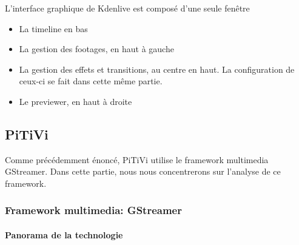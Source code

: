 {\begin{figure}[H]
\end{figure}

L'interface graphique de Kdenlive est composé d'une seule fenêtre 

\begin{itemize}

  \item {La timeline en bas}

  \item {La gestion des footages, en haut à gauche}

  \item {La gestion des effets et transitions, au centre en haut. La
  configuration de ceux-ci se fait dans cette même partie.}

  \item {Le previewer, en haut à droite}

\end{itemize}

\subsection {PiTiVi}

Comme précédemment énoncé, PiTiVi utilise le framework multimedia
GStreamer. Dans cette partie, nous nous concentrerons sur l'analyse
de ce framework.

\subsubsection {Framework multimedia: GStreamer}

\paragraph {Panorama de la technologie} %

\subparagraph{}

}
